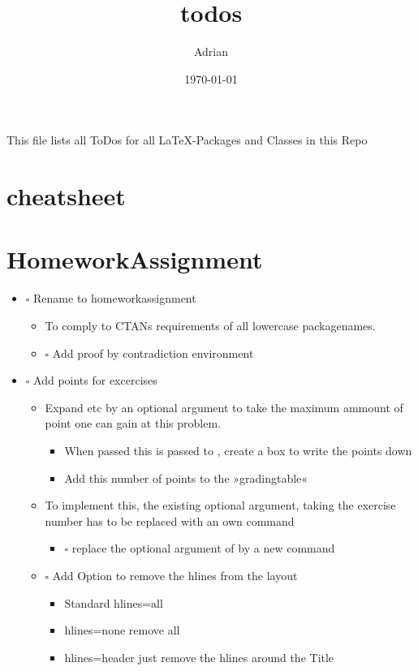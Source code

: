 \documentclass[11pt]{article}
\author{Adrian}
\date{\today}
\title{todos}
\begin{document}
\maketitle
\tableofcontents

This file lists all ToDos for all \LaTeX{}-Packages and Classes in this
Repo


\section{cheatsheet}
\label{sec-1}



\section{HomeworkAssignment}
\label{sec-2}
\begin{itemize}
\item $\square$ Rename to homeworkassignment
\begin{itemize}
\item To comply to CTANs requirements of all lowercase packagenames.
\item $\square$ Add proof by contradiction environment
\end{itemize}
\item $\square$ Add points for excercises
\begin{itemize}
\item Expand \newproblem \newsubproblem etc by an optional argument to
take the maximum ammount of point one can gain at this problem.
\begin{itemize}
\item When passed this is passed to \newsubproblem, create a box to
write the points down
\item Add this number of points to the »gradingtable«
\end{itemize}
\item To implement this, the existing optional argument, taking
the exercise number has to be replaced with an own command
\begin{itemize}
\item $\square$ replace the optional argument of \newproblem by a new
command \setproblemnumber
\end{itemize}
\item $\square$ Add Option to remove the hlines from the layout
\begin{itemize}
\item Standard hlines=all
\item hlines=none remove all
\item hlines=header just remove the hlines around the Title
\end{itemize}
\end{itemize}
\end{itemize}
\end{document}
